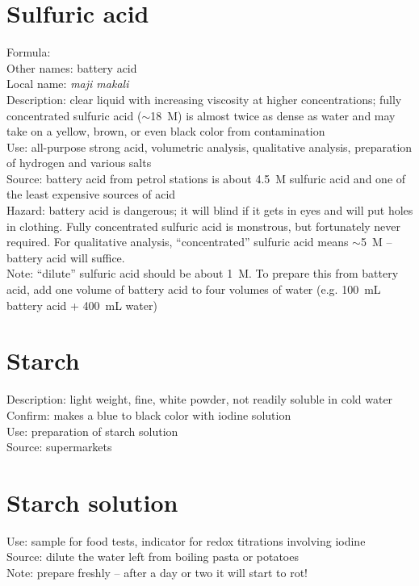 \section{Sulfuric acid}
\label{sec:}
Formula: \\
Other names: battery acid\\
Local name: \textit{maji makali}\\
Description: clear liquid with increasing viscosity at higher concentrations; 
fully concentrated sulfuric acid ($\sim$18~M) is almost twice as dense as water 
and may take on a yellow, 
brown, 
or even black color from contamination\\
Use: all-purpose strong acid, 
volumetric analysis, 
qualitative analysis, 
preparation of hydrogen and various salts\\
Source: battery acid from petrol stations 
is about 4.5~M sulfuric acid and one of the least expensive sources of acid\\
Hazard: battery acid is dangerous; 
it will blind if it gets in eyes and will put holes in clothing. 
Fully concentrated sulfuric acid is monstrous, 
but fortunately never required. 
For qualitative analysis, 
``concentrated'' sulfuric acid means $\sim$5~M -- battery acid will suffice.\\
Note: ``dilute'' sulfuric acid should be about 1~M. 
To prepare this from battery acid, 
add one volume of battery acid to four volumes of water (e.g. 
100~mL battery acid + 400~mL water)

\section{Starch}
\label{sec:}
Description: light weight, 
fine, 
white powder, 
not readily soluble in cold water\\
Confirm: makes a blue to black color with iodine solution\\
Use: preparation of starch solution\\
Source: supermarkets

\section{Starch solution}
\label{sec:}
Use: sample for food tests, 
indicator for redox titrations involving iodine\\
Source: dilute the water left from boiling pasta or potatoes\\
Note: prepare freshly -- after a day or two it will start to rot!

